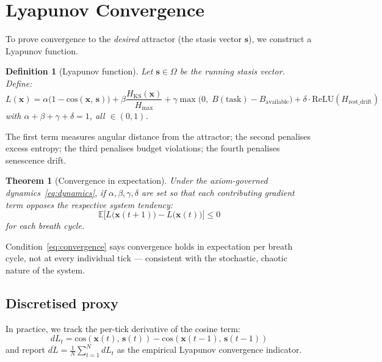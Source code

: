 \documentclass[11pt, a4paper]{article}
\newtheorem{theorem}{Theorem}
\newtheorem{definition}{Definition}
\newcommand{\E}{\mathbb{E}}
\newcommand{\stasis}{\bm{s}}
\newcommand{\sv}{\bm{x}}
\newcommand{\cosim}[2]{\mathrm{cos}\!\left(#1,\, #2\right)}
\begin{document}
\section{Lyapunov Convergence}
\label{sec:lyapunov}

To prove convergence to the \emph{desired} attractor (the stasis vector
$\stasis$), we construct a Lyapunov function.

\begin{definition}[Lyapunov function]
\label{def:lyapunov}
Let $\stasis \in \Omega$ be the running stasis vector.
Define:
\begin{equation}
  L(\sv) = \alpha \bigl(1 - \cosim{\sv}{\stasis}\bigr)
          + \beta \frac{H_\text{KS}(\sv)}{H_\text{max}}
          + \gamma \max\!\bigl(0,\; B(\text{task}) - B_\text{available}\bigr)
          + \delta \cdot \mathrm{ReLU}(H_\text{rest\_drift})
\label{eq:lyapunov}
\end{equation}
with $\alpha + \beta + \gamma + \delta = 1$, all $\in (0,1)$.
\end{definition}

The first term measures angular distance from the attractor;
the second penalises excess entropy; the third penalises budget violations;
the fourth penalises senescence drift.

\begin{theorem}[Convergence in expectation]
\label{thm:convergence}
Under the axiom-governed dynamics~\eqref{eq:dynamics},
if $\alpha, \beta, \gamma, \delta$ are set so that each contributing
gradient term opposes the respective system tendency:
\begin{equation}
  \E\bigl[L\bigl(\sv(t+1)\bigr) - L\bigl(\sv(t)\bigr)\bigr] \le 0
\label{eq:convergence}
\end{equation}
for each breath cycle.
\end{theorem}

Condition~\eqref{eq:convergence} says convergence holds in expectation per
breath cycle, not at every individual tick — consistent with the stochastic,
chaotic nature of the system.

\subsection*{Discretised proxy}

In practice, we track the per-tick derivative of the cosine term:
\begin{equation}
  dL_t = \cosim{\sv(t)}{\stasis(t)} - \cosim{\sv(t-1)}{\stasis(t-1)}
\end{equation}
and report $\overline{dL} = \frac{1}{N}\sum_{t=1}^{N} dL_t$
as the empirical Lyapunov convergence indicator.
\end{document}
